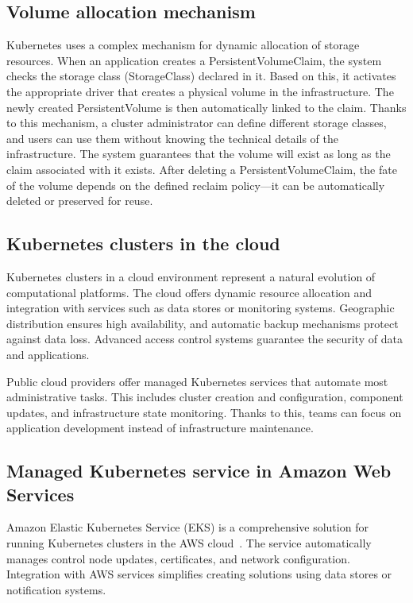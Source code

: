 \subsection{Volume allocation mechanism}
Kubernetes uses a complex mechanism for dynamic allocation of storage resources.
When an application creates a PersistentVolumeClaim, the system checks the storage class (StorageClass) declared in it.
Based on this, it activates the appropriate driver that creates a physical volume in the infrastructure.
The newly created PersistentVolume is then automatically linked to the claim.
Thanks to this mechanism, a cluster administrator can define different storage classes, and users can use them without knowing the technical details of the infrastructure.
The system guarantees that the volume will exist as long as the claim associated with it exists.
After deleting a PersistentVolumeClaim, the fate of the volume depends on the defined reclaim policy—it can be automatically deleted or preserved for reuse.

\subsection{Kubernetes clusters in the cloud}

Kubernetes clusters in a cloud environment represent a natural evolution of computational platforms.
The cloud offers dynamic resource allocation and integration with services such as data stores or monitoring systems.
Geographic distribution ensures high availability, and automatic backup mechanisms protect against data loss.
Advanced access control systems guarantee the security of data and applications.

Public cloud providers offer managed Kubernetes services that automate most administrative tasks.
This includes cluster creation and configuration, component updates, and infrastructure state monitoring.
Thanks to this, teams can focus on application development instead of infrastructure maintenance.

\subsection{Managed Kubernetes service in Amazon Web Services}\label{subsec:aws-eks}

Amazon Elastic Kubernetes Service (EKS) is a comprehensive solution for running Kubernetes clusters in the AWS cloud~\cite{amazon_eks}.
The service automatically manages control node updates, certificates, and network configuration.
Integration with AWS services simplifies creating solutions using data stores or notification systems.

